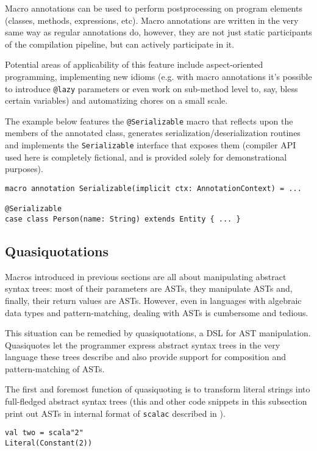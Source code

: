 \documentclass{llncs}
\begin{document}
Macro annotations can be used to perform postprocessing on program elements (classes, methods, expressions, etc).
Macro annotations are written in the very same way as regular annotations do, however, they are not just static participants of the compilation pipeline,
but can actively participate in it.

Potential areas of applicability of this feature include aspect-oriented programming,
implementing new idioms (e.g. with macro annotations it's possible to introduce \texttt{@lazy} parameters or even work on sub-method level to, say, bless certain variables) and
automatizing chores on a small scale.

The example below features the \texttt{@Serializable} macro that reflects upon the members of the annotated class, generates serialization/deserialization routines and
implements the \texttt{Serializable} interface that exposes them (compiler API used here is completely fictional, and is provided solely for demonstrational purposes).

\noindent
\begin{verbatim}
macro annotation Serializable(implicit ctx: AnnotationContext) = ...

@Serializable
case class Person(name: String) extends Entity { ... }
\end{verbatim}
\noindent

\subsection{Quasiquotations}

Macros introduced in previous sections are all about manipulating abstract syntax trees: most of their parameters are ASTs,
they manipulate ASTs and, finally, their return values are ASTs. However, even in languages with algebraic data types and pattern-matching,
dealing with ASTs is cumbersome and tedious.

This situation can be remedied by quasiquotations, a DSL for AST manipulation. Quasiquotes let the programmer express abstract syntax trees
in the very language these trees describe and also provide support for composition and pattern-matching of ASTs.

The first and foremost function of quasiquoting is to transform literal strings into full-fledged abstract syntax trees
(this and other code snippets in this subsection print out ASTs in internal format of \texttt{scalac} described in \cite{stocker10}).

\noindent
\begin{verbatim}
val two = scala"2"
Literal(Constant(2))
\end{verbatim}
\noindent
\end{document}
